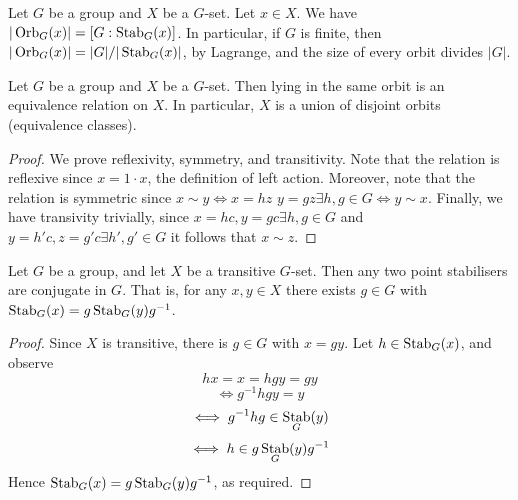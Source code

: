 \begin{corollary}
  Let $G$ be a group and $X$ be a $G$-set. Let $x\in X$. We have $|\operatorname*{Orb}_{G}(x)|=
  [G:\operatorname*{Stab}_G(x)]$. In particular, if $G$ is finite, then $|\operatorname*{Orb}_{G}(x)|=|G|/|\operatorname*{Stab}_G(x)|$,
  by Lagrange, and the size of every orbit divides $|G|$.
  \label{cor:orbStab}
\end{corollary}


\begin{theorem}
  Let $G$ be a group and $X$ be a $G$-set. Then lying in the same orbit is an equivalence
  relation on $X$. In particular, $X$ is a union of disjoint orbits (equivalence classes).
  \label{thm:eqRelOrb}
\end{theorem}
\begin{proof}
  We prove reflexivity, symmetry, and transitivity. Note that the relation is reflexive
  since $x=1\cdot x$, the definition of left action. Moreover, note that the relation is
  symmetric since $x\sim y \iff x=hz$ $y=gz\exists h,g\in G \iff y\sim x$. Finally, we
  have transivity trivially, since $x=hc,y=gc\exists h,g\in G$ and $y=h'c,z=g'c\exists
  h',g'\in G$ it follows that $x\sim z$.
\end{proof}


\begin{theorem}
  Let $G$ be a group, and let $X$ be a transitive $G$-set. Then any two point stabilisers are
  conjugate in $G$. That is, for any $x,y\in X$ there exists $g\in G$ with
  $\operatorname*{Stab}_G(x)=g\operatorname*{Stab}_G(y)g^{-1}$.
  \label{<+label+>}
\end{theorem}
\begin{proof}
  Since $X$ is transitive, there is $g\in G$ with $x=gy$. Let $h\in\operatorname*{Stab}_G(x)$, and
  observe
  \[hx=x=hgy=gy\]
  \[\iff g^{-1}hgy = y\]
  \[\iff g^{-1}hg\in\operatorname*{Stab}_G(y)\]
  \[\iff h\in g\operatorname*{Stab}_G(y)g^{-1}\]
  Hence $\operatorname*{Stab}_G(x)=g\operatorname*{Stab}_G(y)g^{-1}$, as required.
\end{proof}

